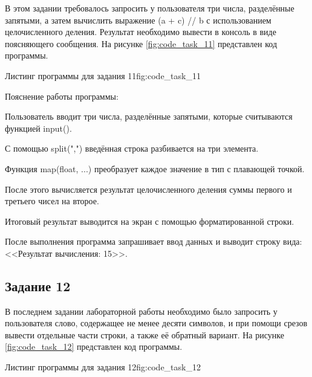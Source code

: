 \documentclass[]{vvsu}
\begin{document}
В этом задании требовалось запросить у пользователя три числа, разделённые запятыми, а затем вычислить выражение (a + c) // b с использованием целочисленного деления.  
Результат необходимо вывести в консоль в виде поясняющего сообщения.  
На рисунке \ref{fig:code_task_11} представлен код программы.

\begin{vvsu_figure}{Листинг программы для задания 11}{fig:code_task_11}
  \begin{minipage}{.75\textwidth}
    
  \end{minipage}
\end{vvsu_figure}

Пояснение работы программы:
\begin{vvsu_list}
  \item Пользователь вводит три числа, разделённые запятыми, которые считываются функцией input().
  \item С помощью split(",") введённая строка разбивается на три элемента.
  \item Функция map(float, ...) преобразует каждое значение в тип с плавающей точкой.
  \item После этого вычисляется результат целочисленного деления суммы первого и третьего чисел на второе.
  \item Итоговый результат выводится на экран с помощью форматированной строки.
\end{vvsu_list}

После выполнения программа запрашивает ввод данных и выводит строку вида:  
<<Результат вычисления: 15>>.

\subsection{Задание 12}

В последнем задании лабораторной работы необходимо было запросить у пользователя слово, содержащее не менее десяти символов, и при помощи срезов вывести отдельные части строки, а также её обратный вариант.  
На рисунке \ref{fig:code_task_12} представлен код программы.

\begin{vvsu_figure}{Листинг программы для задания 12}{fig:code_task_12}
  \begin{minipage}{.75\textwidth}
    
  \end{minipage}
\end{vvsu_figure}
\end{document}

